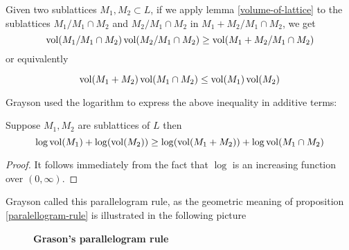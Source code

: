 Given two sublattices $M_1,M_2 \subset L$, if we apply lemma \ref{volume-of-lattice} to the sublattices
$M_1/M_1\cap M_2$ and $M_2/M_1\cap M_2$ in $M_1+M_2/M_1\cap M_2$, we get
\[\operatorname{vol}(M_1/M_1 \cap M_2)\operatorname{vol}(M_2/M_1\cap M_2) \ge \operatorname{vol}(M_1+M_2/M_1\cap M_2)\]
or equivalently
\begin{lemma}
    \[\operatorname{vol}(M_1+M_2)\operatorname{vol}(M_1\cap M_2) \le \operatorname{vol}(M_1)\operatorname{vol}(M_2)\]
\end{lemma}
Grayson used the logarithm to express the above inequality in additive terms:
\begin{prop}\label{parallelogram-rule}
    Suppose $M_1,M_2$ are sublattices of $L$ then
    \[\log\operatorname{vol}(M_1)+\log(\operatorname{vol}(M_2)) \ge \log(\operatorname{vol}(M_1+M_2))+\log\operatorname{vol}(M_1\cap M_2)\]
\end{prop}
\begin{proof}
    It follows immediately from the fact that $\log$ is an increasing function over $(0,\infty)$.
\end{proof}
Grayson called this parallelogram rule, as the geometric meaning of  proposition \ref{paralellogram-rule} is
illustrated in the following picture
\begin{figure}[ht]
    \centering
    \caption{\textbf{Grason's parallelogram  rule}}
\end{figure}

